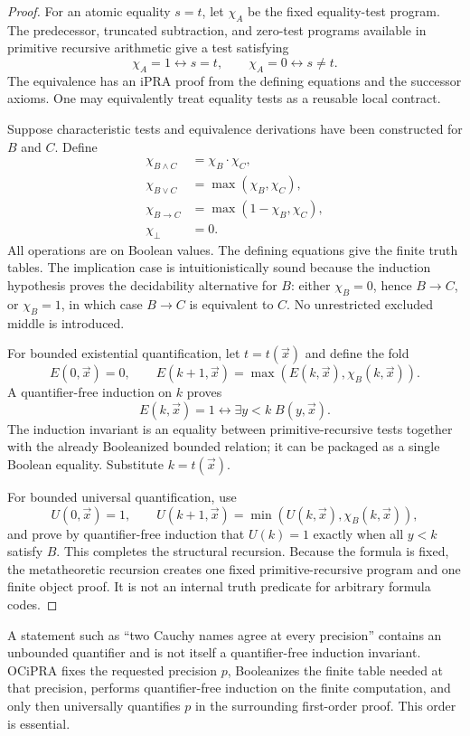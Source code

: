 \begin{proof}
For an atomic equality \(s=t\), let \(\chi_A\) be the fixed equality-test program.  The predecessor, truncated subtraction, and zero-test programs available in primitive recursive arithmetic give a test satisfying
\[
 \chi_A=1\leftrightarrow s=t,
 \qquad
 \chi_A=0\leftrightarrow s\neq t.
\]
The equivalence has an iPRA proof from the defining equations and the successor axioms.  One may equivalently treat equality tests as a reusable local contract.

Suppose characteristic tests and equivalence derivations have been constructed for \(B\) and \(C\).  Define
\[
\begin{aligned}
 \chi_{B\wedge C}&=\chi_B\cdot\chi_C,\\
 \chi_{B\vee C}&=\max(\chi_B,\chi_C),\\
 \chi_{B\to C}&=\max(1-\chi_B,\chi_C),\\
 \chi_{\bot}&=0.
\end{aligned}
\]
All operations are on Boolean values.  The defining equations give the finite truth tables.  The implication case is intuitionistically sound because the induction hypothesis proves the decidability alternative for \(B\): either \(\chi_B=0\), hence \(B\to C\), or \(\chi_B=1\), in which case \(B\to C\) is equivalent to \(C\).  No unrestricted excluded middle is introduced.

For bounded existential quantification, let \(t=t(\vec x)\) and define the fold
\[
 E(0,\vec x)=0,
 \qquad
 E(k+1,\vec x)=\max(E(k,\vec x),\chi_B(k,\vec x)).
\]
A quantifier-free induction on \(k\) proves
\[
 E(k,\vec x)=1
 \leftrightarrow
 \exists y<k\;B(y,\vec x).
\]
The induction invariant is an equality between primitive-recursive tests together with the already Booleanized bounded relation; it can be packaged as a single Boolean equality.  Substitute \(k=t(\vec x)\).

For bounded universal quantification, use
\[
 U(0,\vec x)=1,
 \qquad
 U(k+1,\vec x)=\min(U(k,\vec x),\chi_B(k,\vec x)),
\]
and prove by quantifier-free induction that \(U(k)=1\) exactly when all \(y<k\) satisfy \(B\).  This completes the structural recursion.  Because the formula is fixed, the metatheoretic recursion creates one fixed primitive-recursive program and one finite object proof.  It is not an internal truth predicate for arbitrary formula codes.
\end{proof}

\begin{remark}
A statement such as ``two Cauchy names agree at every precision'' contains an unbounded quantifier and is not itself a quantifier-free induction invariant.  OCiPRA fixes the requested precision \(p\), Booleanizes the finite table needed at that precision, performs quantifier-free induction on the finite computation, and only then universally quantifies \(p\) in the surrounding first-order proof.  This order is essential.
\end{remark}


